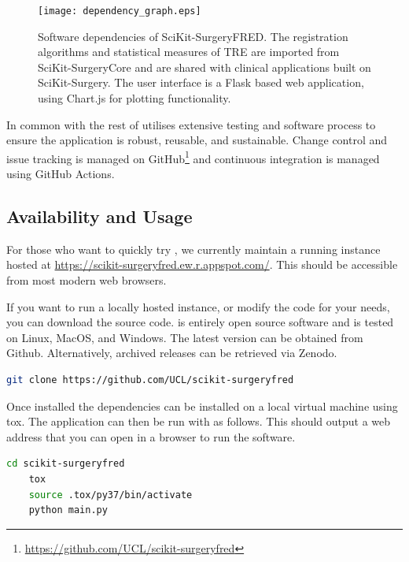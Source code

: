 \begin{figure}
	\begin{center}
	\texttt{[image: dependency\_graph.eps]}
		\caption{\label{fig:dependencies}Software dependencies of SciKit-SurgeryFRED. The registration algorithms and statistical measures of {TRE} are imported from SciKit-SurgeryCore and are shared with clinical applications built on SciKit-Surgery. The user interface is a Flask based web application, using Chart.js for plotting functionality.}
	\end{center}
\end{figure}

In common with the rest of \sksurgery \fred utilises extensive testing and software process \cite{1398621} to 
ensure the application is robust, reusable, and sustainable\cite{VENTERS2018174}. Change control and issue tracking is managed
on GitHub\footnote{\href{https://github.com/UCL/scikit-surgeryfred}{https://github.com/UCL/scikit-surgeryfred}} and continuous integration is managed using
GitHub Actions.

\subsection{Availability and Usage}
For those who want to quickly try \fredns, we currently maintain a running instance hosted at \href{https://scikit-surgeryfred.ew.r.appspot.com/}{https://scikit-surgeryfred.ew.r.appspot.com/}. This should be accessible from most modern web browsers.

If you want to run a locally hosted instance, or modify the code for your needs, you can download the source code. \fred is entirely open source software and is tested on Linux, MacOS, and Windows. The latest version can be obtained from Github. Alternatively, archived releases can be retrieved via Zenodo\cite{stephen_thompson_2020_4314971}.

\begin{lstlisting}[language=bash]
	git clone https://github.com/UCL/scikit-surgeryfred
\end{lstlisting}

Once installed the dependencies can be installed on a local virtual machine using tox. The application can then be run with as follows. This should output a web address that you can open in a browser to run the software. 

\begin{lstlisting}[language=bash]
	cd scikit-surgeryfred
	tox
	source .tox/py37/bin/activate
	python main.py
\end{lstlisting}

